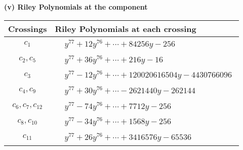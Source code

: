 \documentclass[1p]{elsarticle_modified}
\theoremstyle{definition}
\begin{document}
\flushleft \textbf{(v) Riley Polynomials at the component}\newline \\
\begin{tabular}{m{50pt}|m{274pt}}
Crossings & \hspace{64pt}Riley Polynomials at each crossing \\
\hline $$\begin{aligned}c_{1}\end{aligned}$$&$\begin{aligned}
&y^{77}+12 y^{76}+\cdots+84256 y-256
\end{aligned}$\\
\hline $$\begin{aligned}c_{2},c_{5}\end{aligned}$$&$\begin{aligned}
&y^{77}+36 y^{76}+\cdots+216 y-16
\end{aligned}$\\
\hline $$\begin{aligned}c_{3}\end{aligned}$$&$\begin{aligned}
&y^{77}-12 y^{76}+\cdots+120020616504 y-4430766096
\end{aligned}$\\
\hline $$\begin{aligned}c_{4},c_{9}\end{aligned}$$&$\begin{aligned}
&y^{77}+30 y^{76}+\cdots-2621440 y-262144
\end{aligned}$\\
\hline $$\begin{aligned}c_{6},c_{7},c_{12}\end{aligned}$$&$\begin{aligned}
&y^{77}-74 y^{76}+\cdots+7712 y-256
\end{aligned}$\\
\hline $$\begin{aligned}c_{8},c_{10}\end{aligned}$$&$\begin{aligned}
&y^{77}-34 y^{76}+\cdots+1568 y-256
\end{aligned}$\\
\hline $$\begin{aligned}c_{11}\end{aligned}$$&$\begin{aligned}
&y^{77}+26 y^{76}+\cdots+3416576 y-65536
\end{aligned}$\\
\hline
\end{tabular}\\~\\
\end{document}
